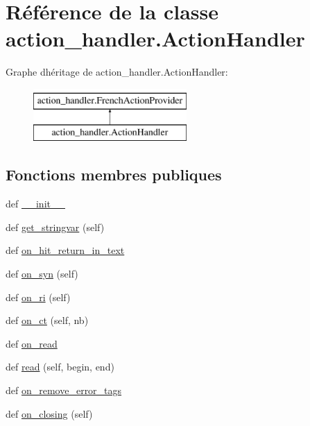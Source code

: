 \hypertarget{classaction__handler_1_1_action_handler}{}\section{Référence de la classe action\+\_\+handler.\+Action\+Handler}
\label{classaction__handler_1_1_action_handler}
Graphe d\textquotesingle{}héritage de action\+\_\+handler.\+Action\+Handler\+:\begin{figure}[H]
\begin{center}
\leavevmode
\includegraphics[height=2.000000cm]{classaction__handler_1_1_action_handler}
\end{center}
\end{figure}
\subsection*{Fonctions membres publiques}
\begin{DoxyCompactItemize}
\item 
def \hyperlink{classaction__handler_1_1_action_handler_ab9353689ea144753aa81274cfd2b3e94}{\+\_\+\+\_\+init\+\_\+\+\_\+}
\item 
def \hyperlink{classaction__handler_1_1_action_handler_a858006ca7b4e89fd9aaec7380082f27d}{get\+\_\+stringvar} (self)
\item 
def \hyperlink{classaction__handler_1_1_action_handler_a317de21aadbf2d67e94dd08e2834a88b}{on\+\_\+hit\+\_\+return\+\_\+in\+\_\+text}
\item 
def \hyperlink{classaction__handler_1_1_action_handler_a5972a9333f2409dede194e38ed84fa56}{on\+\_\+syn} (self)
\item 
def \hyperlink{classaction__handler_1_1_action_handler_a36ba2d42c8aef651793086a5ab9b24b2}{on\+\_\+ri} (self)
\item 
def \hyperlink{classaction__handler_1_1_action_handler_a03e4f47e31a72b8f88f7532471ae9aac}{on\+\_\+ct} (self, nb)
\item 
def \hyperlink{classaction__handler_1_1_action_handler_a3326e440d1af67c7f47f44e7cf495f1f}{on\+\_\+read}
\item 
def \hyperlink{classaction__handler_1_1_action_handler_ab473b0ae56991350b6668d5b654ffe97}{read} (self, begin, end)
\item 
def \hyperlink{classaction__handler_1_1_action_handler_a40f47fb4537fed9b037fe547c637316a}{on\+\_\+remove\+\_\+error\+\_\+tags}
\item 
def \hyperlink{classaction__handler_1_1_action_handler_a9a1f3c2b07ed4841cc412f7719be139d}{on\+\_\+closing} (self)
\end{DoxyCompactItemize}
